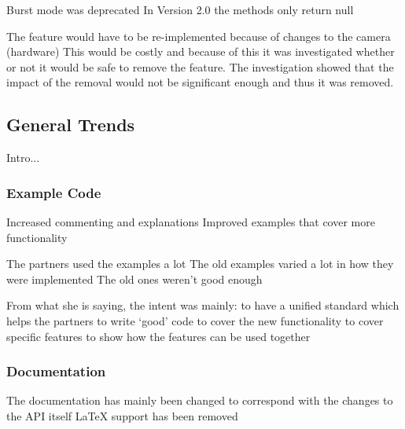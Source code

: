 \documentclass[conference]{IEEEtran}
\begin{document}
Burst mode was deprecated
In Version 2.0 the methods only return null




The feature would have to be re-implemented because of changes to the camera (hardware)
This would be costly and because of this it was investigated whether or not it would be safe to remove the feature. The investigation showed that the impact of the removal would not be significant enough and thus it was removed.







\subsection{General Trends}	

Intro...


\subsubsection{Example Code}


Increased commenting and explanations
Improved examples that cover more functionality



The partners used the examples a lot
The old examples varied a lot in how they were implemented
The old ones weren’t good enough

From what she is saying, the intent was mainly:
to have a unified standard
which helps the partners to write ‘good’ code
to cover the new functionality
to cover specific features
to show how the features can be used together








\subsubsection{Documentation}


The documentation has mainly been changed to correspond with the changes to the API itself
LaTeX support has been removed
\end{document}
